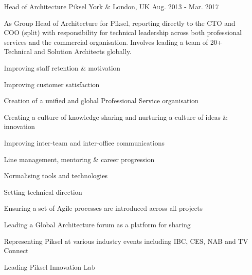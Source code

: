 \begin{cventries}

\cvexpentry
{Head of Architecture} %
{Piksel} %
{York \& London, UK} %
{Aug. 2013 - Mar. 2017} %
{
\begin{cvitemstitle}
\item {As Group Head of Architecture for Piksel, reporting directly to the CTO and COO (split) with responsibility for technical leadership across both professional services and the commercial organisation. Involves leading a team of 20+ Technical and Solution Architects globally.}
\end{cvitemstitle}
}
{ %
\begin{cvitems}
\item {Improving staff retention \& motivation}
\item {Improving customer satisfaction}
\item {Creation of a unified and global Professional Service organisation}
\item {Creating a culture of knowledge sharing and nurturing a culture of ideas \& innovation}
\item {Improving inter-team and inter-office communications}
\item {Line management, mentoring \& career progression}
\item {Normalising tools and technologies}
\item {Setting technical direction}
\item {Ensuring a set of Agile processes are introduced across all projects}
\item {Leading a Global Architecture forum as a platform for sharing}
\item {Representing Piksel at various industry events including IBC, CES, NAB and TV Connect}
\item {Leading Piksel Innovation Lab}
\end{cvitems}
}



\end{cventries}
